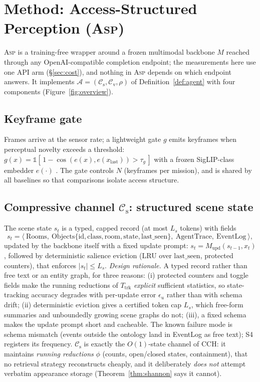 \documentclass[10pt]{article}
\theoremstyle{definition}
\theoremstyle{plain}
\newcommand{\ASP}{\textsc{Asp}}
\newcommand{\cs}{\mathcal{C}_{\mathrm{s}}}
\newcommand{\cv}{\mathcal{C}_{\mathrm{v}}}
\newcommand{\A}{\mathcal{A}}
\begin{document}
\section{Method: Access-Structured Perception (\ASP{})}
\label{sec:method}

\ASP{} is a training-free wrapper around a frozen multimodal backbone $M$ reached through any OpenAI-compatible completion endpoint; the measurements here use one API arm (\S\ref{sec:cost}), and nothing in \ASP{} depends on which endpoint answers. It implements $\A=(\cs,\cv,\rho)$ of Definition~\ref{def:agent} with four components (Figure~\ref{fig:overview}).

\subsection{Keyframe gate}
Frames arrive at the sensor rate; a lightweight gate $g$ emits keyframes when perceptual novelty exceeds a threshold: $g(x)=\mathbb{1}[\,1-\cos(e(x),e(x_{\mathrm{last}}))>\tau_g\,]$ with a frozen SigLIP-class embedder $e(\cdot)$ \citep{siglip}. The gate controls $N$ (keyframes per mission), and is shared by all baselines so that comparisons isolate access structure.

\subsection{Compressive channel $\cs$: structured scene state}
The scene state $s_t$ is a typed, capped record (at most $L_s$ tokens) with fields
\[
s_t=\bigl\langle\ \mathrm{Rooms},\ \mathrm{Objects}\{\mathrm{id},\mathrm{class},\mathrm{room},\mathrm{state},\mathrm{last\_seen}\},\ \mathrm{AgentTrace},\ \mathrm{EventLog}\ \bigr\rangle,
\]
updated by the backbone itself with a fixed update prompt: $s_t=M_{\mathrm{upd}}(s_{t-1},x_t)$, followed by deterministic salience eviction (LRU over $\mathrm{last\_seen}$, protected counters), that enforces $|s_t|\le L_s$. \emph{Design rationale.} A typed record rather than free text or an entity graph, for three reasons: (i) protected counters and toggle fields make the running reductions of $T_{\mathrm{trk}}$ \emph{explicit} sufficient statistics, so state-tracking accuracy degrades with per-update error $\epsilon_u$ rather than with schema drift; (ii) deterministic eviction gives a certified token cap $L_s$, which free-form summaries and unboundedly growing scene graphs \citep{conceptgraphs,sayplan,egagent} do not; (iii), a fixed schema makes the update prompt short and cacheable. The known failure mode is schema mismatch (events outside the ontology land in \textrm{EventLog} as free text); S4 registers its frequency. $\cs$ is exactly the $O(1)$-state channel of CCH: it maintains \emph{running reductions} $\phi$ (counts, open/closed states, containment), that no retrieval strategy reconstructs cheaply, and it deliberately \emph{does not} attempt verbatim appearance storage (Theorem~\ref{thm:shannon} says it cannot).
\end{document}
